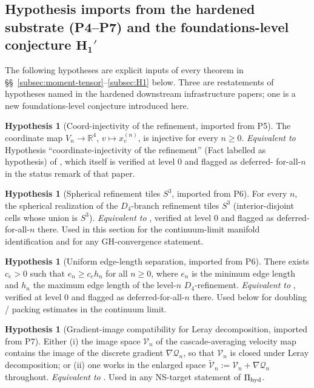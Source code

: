 \documentclass[11pt, a4paper]{amsart}
\theoremstyle{definition}
\newtheorem{hypothesis}[theorem]{Hypothesis}
\newcommand{\R}{\mathbb{R}}
\newcommand{\hyd}{{\rm hyd}}
\begin{document}
\subsection{Hypothesis imports from the hardened substrate (P4--P7)
  and the foundations-level conjecture $\mathbf{H_1'}$}
\label{subsec:metric-hydro-imports}

The following hypotheses are explicit inputs of every theorem in
\S\S~\ref{subsec:moment-tensor}--\ref{subsec:H1} below. Three are
restatements of hypotheses named in the hardened downstream
infrastructure papers; one is a new foundations-level conjecture
introduced here.

\begin{hypothesis}[Coord-injectivity of the refinement, imported from P5]
\label{hyp:coord-inj-import}
The coordinate map $V_n \to \R^4$, $v \mapsto x_v^{(n)}$, is
injective for every $n \geq 0$. \emph{Equivalent to} Hypothesis
``coordinate-injectivity of the refinement'' (Fact labelled as
hypothesis) of \cite[Hypothesis~fact:distinct]{CascadeMetricProjection},
which itself is verified at level $0$ and flagged as deferred-
for-all-$n$ in the status remark of that paper.
\end{hypothesis}

\begin{hypothesis}[Spherical refinement tiles $S^3$, imported from P6]
\label{hyp:tiling-import}
For every $n$, the spherical realization of the $D_4$-branch
refinement tiles $S^3$ (interior-disjoint cells whose union is
$S^3$). \emph{Equivalent to} \cite[Hypothesis~fact:tiling]{CascadeSchlafli},
verified at level $0$ and flagged as deferred-for-all-$n$ there.
Used in this section for the continuum-limit manifold
identification and for any GH-convergence statement.
\end{hypothesis}

\begin{hypothesis}[Uniform edge-length separation, imported from P6]
\label{hyp:separation-import}
There exists $c_e > 0$ such that $e_n \geq c_e h_n$ for all $n \geq
0$, where $e_n$ is the minimum edge length and $h_n$ the maximum
edge length of the level-$n$ $D_4$-refinement.
\emph{Equivalent to} \cite[Hypothesis~fact:separation]{CascadeSchlafli},
verified at level $0$ and flagged as deferred-for-all-$n$ there.
Used below for doubling / packing estimates in the continuum limit.
\end{hypothesis}

\begin{hypothesis}[Gradient-image compatibility for Leray decomposition, imported from P7]
\label{hyp:gradient-image-import}
Either (i) the image space $\mathcal V_n$ of the cascade-averaging
velocity map contains the image of the discrete gradient
$\nabla \mathcal Q_n$, so that $\mathcal V_n$ is closed under
Leray decomposition; or (ii) one works in the enlarged space
$\widetilde{\mathcal V}_n := \mathcal V_n + \nabla \mathcal Q_n$
throughout. \emph{Equivalent to}
\cite[Hypothesis~hyp:gradient-image]{CascadeHydroProjection}.
Used in any NS-target statement of $\Pi_{\hyd}$.
\end{hypothesis}
\end{document}

